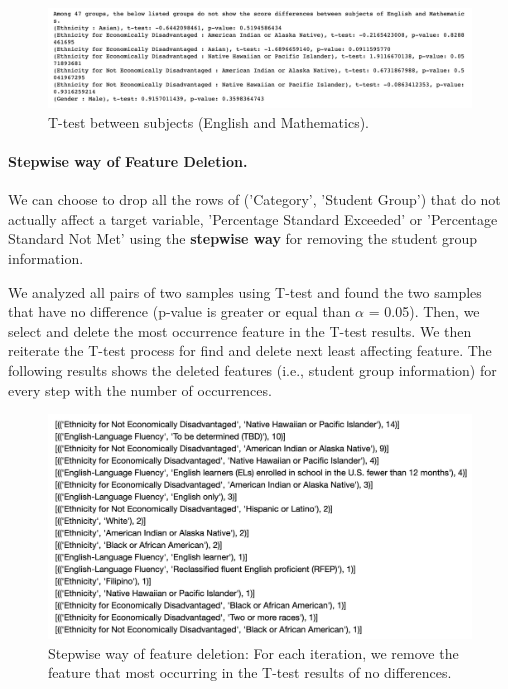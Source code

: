 \documentclass[11pt]{article}
\begin{document}
\begin{figure}[h!]
\centering 
\includegraphics[width=\textwidth]{t-test_subjects.png}
\caption{T-test between subjects (English and Mathematics).}
  \label{fig:t-test_subjects}
\end{figure}

\paragraph*{Stepwise way of Feature Deletion.}
We can choose to drop all the rows of ('Category', 'Student Group') that do not actually affect a target variable, 'Percentage Standard Exceeded' or 'Percentage Standard Not Met' using the \textbf{stepwise way} for removing the student group information.

We analyzed all pairs of two samples using T-test and found the two samples that have no difference (p-value is greater or equal than $\alpha$ = 0.05). Then, we select and delete the most occurrence feature in the T-test results. 
%
We then reiterate the T-test process for find and delete next least affecting feature. The following results shows the deleted features (i.e., student group information) for every step with the number of occurrences.

\begin{figure}[h!]
\centering 
\includegraphics[width=\textwidth]{t-test_stepwise.png}
\caption{Stepwise way of feature deletion: For each iteration, we remove the feature that most occurring in the T-test results of no differences.}
  \label{fig:t-test_stepwise}
\end{figure}
\end{document}
